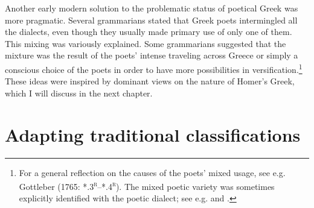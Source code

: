 Another early modern solution to the problematic status of poetical Greek was more pragmatic. Several grammarians stated that Greek poets intermingled all the dialects, even though they usually made primary use of only one of them. This mixing was variously explained. Some grammarians suggested that the mixture was the result of the poets’ intense traveling across Greece or simply a conscious choice of the poets in order to have more possibilities in versification.\footnote{For a general reflection on the causes of the poets’ mixed usage, see e.g. Gottleber (1765: *.3\textsc{\textsuperscript{r}}–*.4\textsc{\textsuperscript{r}}). The mixed poetic variety was sometimes explicitly identified with the poetic dialect; see e.g. \citet[111]{Bayly1756} and \citet[198]{Peternader1776}.} These ideas were inspired by dominant views on the nature of Homer’s Greek, which I will discuss in the next chapter.

\section{Adapting traditional classifications}

